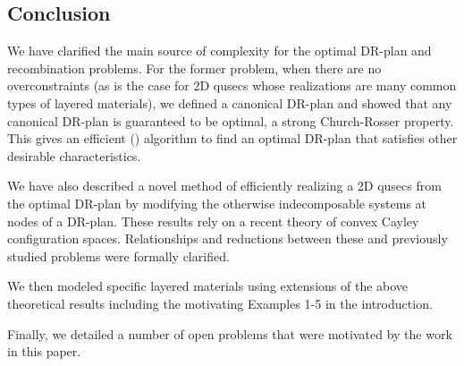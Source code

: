 






\subsection{Conclusion}
We have clarified the main source of complexity for the optimal DR-plan and recombination problems. For the former problem, when there are no overconstraints (as is the case for 2D qusecs whose realizations are many common types of layered materials), we defined a canonical DR-plan and showed that any canonical DR-plan is guaranteed to be optimal, a strong Church-Rosser property. This gives an efficient (\ComplexityCanDRP) algorithm to find an optimal DR-plan that satisfies other desirable characteristics.

We have also described a novel method of efficiently realizing a 2D qusecs from the optimal DR-plan by modifying the otherwise indecomposable systems  at nodes of a DR-plan. These results rely on a recent theory of convex Cayley configuration spaces. Relationships and reductions between these and previously studied problems were formally clarified.

We then modeled specific layered materials using extensions of the above theoretical results including the motivating Examples 1-5 in the introduction.

Finally, we detailed a number of open problems that were motivated by the work in this paper.
